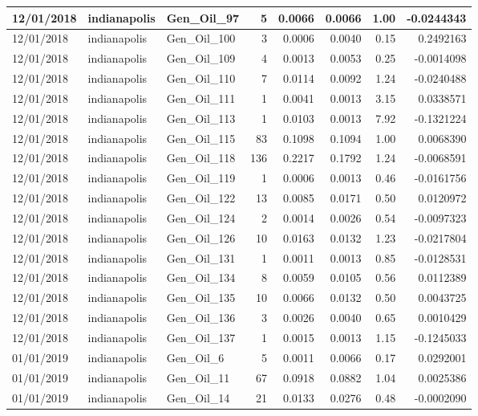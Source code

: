 \documentclass[
  letterpaper,
  DIV=11,
  numbers=noendperiod]{scrartcl}
\begin{document}
\begin{tabular}{l|l|l|r|r|r|r|r}
\hline
12/01/2018 & indianapolis & Gen\_Oil\_97 & 5 & 0.0066 & 0.0066 & 1.00 & -0.0244343\\
\hline
12/01/2018 & indianapolis & Gen\_Oil\_100 & 3 & 0.0006 & 0.0040 & 0.15 & 0.2492163\\
\hline
12/01/2018 & indianapolis & Gen\_Oil\_109 & 4 & 0.0013 & 0.0053 & 0.25 & -0.0014098\\
\hline
12/01/2018 & indianapolis & Gen\_Oil\_110 & 7 & 0.0114 & 0.0092 & 1.24 & -0.0240488\\
\hline
12/01/2018 & indianapolis & Gen\_Oil\_111 & 1 & 0.0041 & 0.0013 & 3.15 & 0.0338571\\
\hline
12/01/2018 & indianapolis & Gen\_Oil\_113 & 1 & 0.0103 & 0.0013 & 7.92 & -0.1321224\\
\hline
12/01/2018 & indianapolis & Gen\_Oil\_115 & 83 & 0.1098 & 0.1094 & 1.00 & 0.0068390\\
\hline
12/01/2018 & indianapolis & Gen\_Oil\_118 & 136 & 0.2217 & 0.1792 & 1.24 & -0.0068591\\
\hline
12/01/2018 & indianapolis & Gen\_Oil\_119 & 1 & 0.0006 & 0.0013 & 0.46 & -0.0161756\\
\hline
12/01/2018 & indianapolis & Gen\_Oil\_122 & 13 & 0.0085 & 0.0171 & 0.50 & 0.0120972\\
\hline
12/01/2018 & indianapolis & Gen\_Oil\_124 & 2 & 0.0014 & 0.0026 & 0.54 & -0.0097323\\
\hline
12/01/2018 & indianapolis & Gen\_Oil\_126 & 10 & 0.0163 & 0.0132 & 1.23 & -0.0217804\\
\hline
12/01/2018 & indianapolis & Gen\_Oil\_131 & 1 & 0.0011 & 0.0013 & 0.85 & -0.0128531\\
\hline
12/01/2018 & indianapolis & Gen\_Oil\_134 & 8 & 0.0059 & 0.0105 & 0.56 & 0.0112389\\
\hline
12/01/2018 & indianapolis & Gen\_Oil\_135 & 10 & 0.0066 & 0.0132 & 0.50 & 0.0043725\\
\hline
12/01/2018 & indianapolis & Gen\_Oil\_136 & 3 & 0.0026 & 0.0040 & 0.65 & 0.0010429\\
\hline
12/01/2018 & indianapolis & Gen\_Oil\_137 & 1 & 0.0015 & 0.0013 & 1.15 & -0.1245033\\
\hline
01/01/2019 & indianapolis & Gen\_Oil\_6 & 5 & 0.0011 & 0.0066 & 0.17 & 0.0292001\\
\hline
01/01/2019 & indianapolis & Gen\_Oil\_11 & 67 & 0.0918 & 0.0882 & 1.04 & 0.0025386\\
\hline
01/01/2019 & indianapolis & Gen\_Oil\_14 & 21 & 0.0133 & 0.0276 & 0.48 & -0.0002090\\

\end{tabular}
\end{document}
